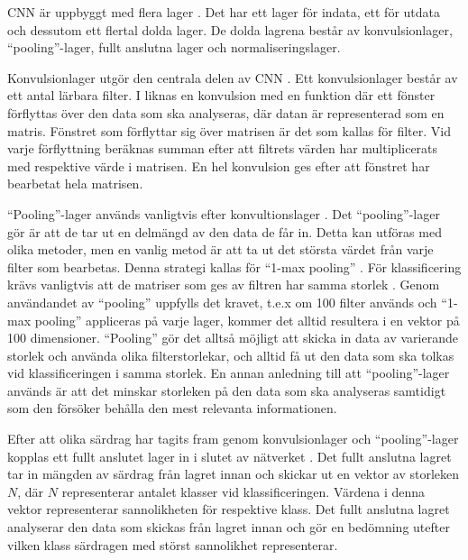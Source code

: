 \documentclass{kaumasters} %
\begin{document}
CNN är uppbyggt med flera lager \cite{cnn:005}. Det har ett lager för indata, ett för utdata och dessutom ett flertal dolda lager. De dolda lagrena består av konvulsionlager, “pooling”-lager, fullt anslutna lager och normaliseringslager. 

Konvulsionlager utgör den centrala delen av CNN \cite{cnn:005}. Ett konvulsionlager består av ett antal lärbara filter. I \cite{cnn:004} liknas en konvulsion med en funktion där ett fönster förflyttas över den data som ska analyseras, där datan är representerad som en matris. Fönstret som förflyttar sig över matrisen är det som kallas för filter. Vid varje förflyttning beräknas summan efter att filtrets värden har multiplicerats med respektive värde i matrisen. En hel konvulsion ges efter att fönstret har bearbetat hela matrisen.

“Pooling”-lager används vanligtvis efter konvultionslager \cite{cnn:004}. Det “pooling”-lager gör är att de tar ut en delmängd av den data de får in. Detta kan utföras med olika metoder, men en vanlig metod är att ta ut det största värdet från varje filter som bearbetas. Denna strategi kallas för “1-max pooling” \cite{cnn:002}. För klassificering krävs vanligtvis att de matriser som ges av filtren har samma storlek \cite{cnn:004}. Genom användandet av “pooling” uppfylls det kravet, t.e.x om 100 filter används och “1-max pooling” appliceras på varje lager, kommer det alltid resultera i en vektor på 100 dimensioner. “Pooling” gör det alltså möjligt att skicka in data av varierande storlek och använda olika filterstorlekar, och alltid få ut den data som ska tolkas vid klassificeringen i samma storlek. En annan anledning till att “pooling”-lager används är att det minskar storleken på den data som ska analyseras samtidigt som den försöker behålla den mest relevanta informationen.

Efter att olika särdrag har tagits fram genom konvulsionlager och “pooling”-lager kopplas ett fullt anslutet lager in i slutet av nätverket \cite{cnn:008}. Det fullt anslutna lagret tar in mängden av särdrag från lagret innan och skickar ut en vektor av storleken $N$, där $N$ representerar antalet klasser vid klassificeringen. Värdena i denna vektor representerar sannolikheten för respektive klass. Det fullt anslutna lagret analyserar den data som skickas från lagret innan och gör en bedömning utefter vilken klass särdragen med störst sannolikhet representerar. 
\end{document}
